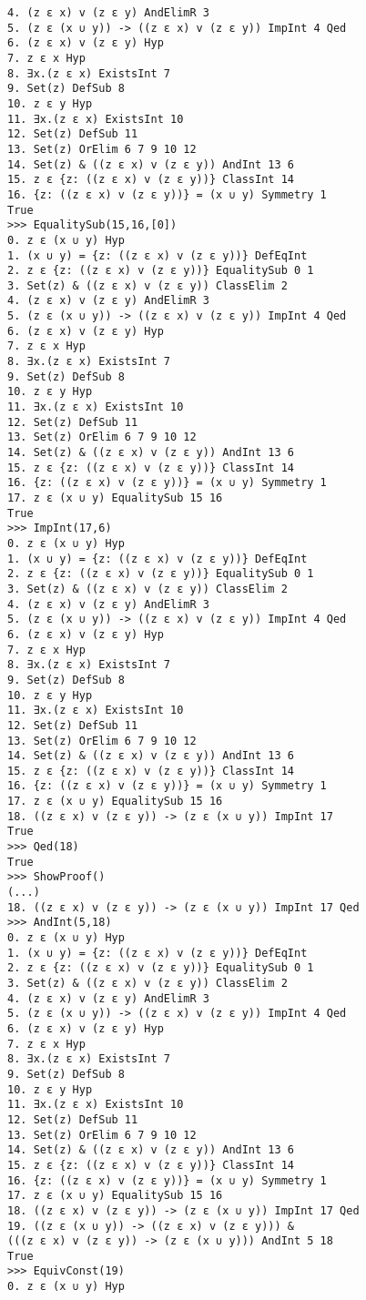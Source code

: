 \documentclass[12pt,leqno]{article}
\numberwithin{equation}{section}
\begin{document}
\begin{verbatim}
4. (z ε x) v (z ε y) AndElimR 3
5. (z ε (x ∪ y)) -> ((z ε x) v (z ε y)) ImpInt 4 Qed
6. (z ε x) v (z ε y) Hyp 
7. z ε x Hyp 
8. ∃x.(z ε x) ExistsInt 7
9. Set(z) DefSub 8
10. z ε y Hyp 
11. ∃x.(z ε x) ExistsInt 10
12. Set(z) DefSub 11
13. Set(z) OrElim 6 7 9 10 12
14. Set(z) & ((z ε x) v (z ε y)) AndInt 13 6
15. z ε {z: ((z ε x) v (z ε y))} ClassInt 14
16. {z: ((z ε x) v (z ε y))} = (x ∪ y) Symmetry 1
True
>>> EqualitySub(15,16,[0])
0. z ε (x ∪ y) Hyp 
1. (x ∪ y) = {z: ((z ε x) v (z ε y))} DefEqInt 
2. z ε {z: ((z ε x) v (z ε y))} EqualitySub 0 1
3. Set(z) & ((z ε x) v (z ε y)) ClassElim 2
4. (z ε x) v (z ε y) AndElimR 3
5. (z ε (x ∪ y)) -> ((z ε x) v (z ε y)) ImpInt 4 Qed
6. (z ε x) v (z ε y) Hyp 
7. z ε x Hyp 
8. ∃x.(z ε x) ExistsInt 7
9. Set(z) DefSub 8
10. z ε y Hyp 
11. ∃x.(z ε x) ExistsInt 10
12. Set(z) DefSub 11
13. Set(z) OrElim 6 7 9 10 12
14. Set(z) & ((z ε x) v (z ε y)) AndInt 13 6
15. z ε {z: ((z ε x) v (z ε y))} ClassInt 14
16. {z: ((z ε x) v (z ε y))} = (x ∪ y) Symmetry 1
17. z ε (x ∪ y) EqualitySub 15 16
True
>>> ImpInt(17,6)
0. z ε (x ∪ y) Hyp 
1. (x ∪ y) = {z: ((z ε x) v (z ε y))} DefEqInt 
2. z ε {z: ((z ε x) v (z ε y))} EqualitySub 0 1
3. Set(z) & ((z ε x) v (z ε y)) ClassElim 2
4. (z ε x) v (z ε y) AndElimR 3
5. (z ε (x ∪ y)) -> ((z ε x) v (z ε y)) ImpInt 4 Qed
6. (z ε x) v (z ε y) Hyp 
7. z ε x Hyp 
8. ∃x.(z ε x) ExistsInt 7
9. Set(z) DefSub 8
10. z ε y Hyp 
11. ∃x.(z ε x) ExistsInt 10
12. Set(z) DefSub 11
13. Set(z) OrElim 6 7 9 10 12
14. Set(z) & ((z ε x) v (z ε y)) AndInt 13 6
15. z ε {z: ((z ε x) v (z ε y))} ClassInt 14
16. {z: ((z ε x) v (z ε y))} = (x ∪ y) Symmetry 1
17. z ε (x ∪ y) EqualitySub 15 16
18. ((z ε x) v (z ε y)) -> (z ε (x ∪ y)) ImpInt 17
True
>>> Qed(18)
True
>>> ShowProof()
(...)
18. ((z ε x) v (z ε y)) -> (z ε (x ∪ y)) ImpInt 17 Qed
>>> AndInt(5,18)
0. z ε (x ∪ y) Hyp 
1. (x ∪ y) = {z: ((z ε x) v (z ε y))} DefEqInt 
2. z ε {z: ((z ε x) v (z ε y))} EqualitySub 0 1
3. Set(z) & ((z ε x) v (z ε y)) ClassElim 2
4. (z ε x) v (z ε y) AndElimR 3
5. (z ε (x ∪ y)) -> ((z ε x) v (z ε y)) ImpInt 4 Qed
6. (z ε x) v (z ε y) Hyp 
7. z ε x Hyp 
8. ∃x.(z ε x) ExistsInt 7
9. Set(z) DefSub 8
10. z ε y Hyp 
11. ∃x.(z ε x) ExistsInt 10
12. Set(z) DefSub 11
13. Set(z) OrElim 6 7 9 10 12
14. Set(z) & ((z ε x) v (z ε y)) AndInt 13 6
15. z ε {z: ((z ε x) v (z ε y))} ClassInt 14
16. {z: ((z ε x) v (z ε y))} = (x ∪ y) Symmetry 1
17. z ε (x ∪ y) EqualitySub 15 16
18. ((z ε x) v (z ε y)) -> (z ε (x ∪ y)) ImpInt 17 Qed
19. ((z ε (x ∪ y)) -> ((z ε x) v (z ε y))) & 
(((z ε x) v (z ε y)) -> (z ε (x ∪ y))) AndInt 5 18
True
>>> EquivConst(19)
0. z ε (x ∪ y) Hyp 

\end{verbatim}
\end{document}

